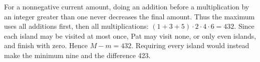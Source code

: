 For a nonnegative current amount, doing an addition before a multiplication by an integer greater than one never decreases the final amount. Thus the maximum uses all additions first, then all multiplications: $(1+3+5)\cdot2\cdot4\cdot6=432$. Since each island may be visited at most once, Pat may visit none, or only even islands, and finish with zero. Hence $M-m=\boxed{432}$. Requiring every island would instead make the minimum nine and the difference 423.

